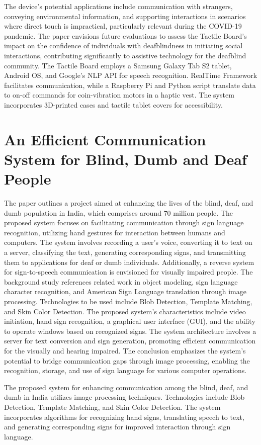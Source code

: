 \documentclass[12pt,a4paper]{report}
\begin{document}
The device's potential applications include communication with strangers, conveying environmental information, and supporting interactions in scenarios where direct touch is impractical, particularly relevant during the COVID-19 pandemic. The paper envisions future evaluations to assess the Tactile Board's impact on the confidence of individuals with deafblindness in initiating social interactions, contributing significantly to assistive technology for the deafblind community.
The Tactile Board employs a Samsung Galaxy Tab S2 tablet, Android OS, and Google's NLP API for speech recognition. RealTime Framework facilitates communication, while a Raspberry Pi and Python script translate data to on-off commands for coin-vibration motors in a haptic vest. The system incorporates 3D-printed cases and tactile tablet covers for accessibility.


\section{An Efficient Communication System for Blind, Dumb and Deaf People }
The paper\cite{ref4} outlines a project aimed at enhancing the lives of the blind, deaf, and dumb population in India, which comprises around 70 million people. The proposed system focuses on facilitating communication through sign language recognition, utilizing hand gestures for interaction between humans and computers. The system involves recording a user's voice, converting it to text on a server, classifying the text, generating corresponding signs, and transmitting them to applications for deaf or dumb individuals. Additionally, a reverse system for sign-to-speech communication is envisioned for visually impaired people. The background study references related work in object modeling, sign language character recognition, and American Sign Language translation through image processing. Technologies to be used include Blob Detection, Template Matching, and Skin Color Detection. The proposed system's characteristics include video initiation, hand sign recognition, a graphical user interface (GUI), and the ability to operate windows based on recognized signs. The system architecture involves a server for text conversion and sign generation, promoting efficient communication for the visually and hearing impaired. The conclusion emphasizes the system's potential to bridge communication gaps through image processing, enabling the recognition, storage, and use of sign language for various computer operations. 

The proposed system for enhancing communication among the blind, deaf, and dumb in India utilizes image processing techniques. Technologies include Blob Detection, Template Matching, and Skin Color Detection. The system incorporates algorithms for recognizing hand signs, translating speech to text, and generating corresponding signs for improved interaction through sign language.
\end{document}
